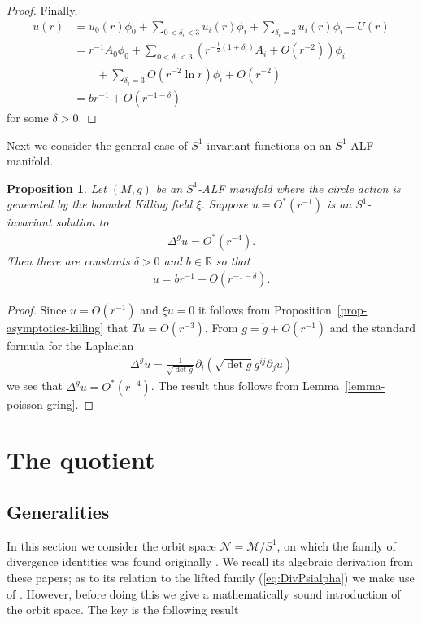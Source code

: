 \documentclass[a4paper,11pt,reqno]{amsart}
\newcommand{\Reals}{\mathbb{R}}
\newcommand{\cM}{\mathcal{M}}
\newcommand{\cN}{\mathcal{N}}
\theoremstyle{plain}
\newtheorem{prop}[thm]{Proposition}
\newcommand{\gring}{\mathring{g}}
\numberwithin{equation}{section}
\begin{document}
\begin{proof}
Finally,
\begin{align}
u(r) &= 
u_0(r)\phi_0 
+ \sum_{0 < \delta_i < 3} u_i(r) \phi_i 
+ \sum_{\delta_i = 3} u_i(r) \phi_i 
+ U(r) \\
&=
r^{-1} A_0 \phi_0
+ \sum_{0 < \delta_i < 3} 
\left( r^{-\frac{1}{2}(1+\delta_i)} A_i + O(r^{-2}) \right)\phi_i \\
&\qquad
+ \sum_{\delta_i = 3} O(r^{-2} \ln r)  \phi_i
+ O(r^{-2})\\
&= b r^{-1} + O(r^{-1-\delta})
\end{align}
for some $\delta > 0$.
\end{proof}

Next we consider the general case of $S^1$-invariant functions on an $S^1$-ALF manifold. 

\begin{prop} \label{prop:poisson-g}
Let $(M,g)$ be an $S^1$-ALF manifold where the circle action is generated by the bounded Killing field $\xi$. Suppose $u = O^*(r^{-1})$ is an $S^1$-invariant solution to
\begin{align}
\Delta^{g}u = O^*(r^{-4}).
\end{align}
Then there are constants $\delta >0$ and $b \in \Reals$ so that 
\begin{align} 
u = br^{-1} + O(r^{-1-\delta}).
\end{align} 
\end{prop}

\begin{proof}
Since $u = O(r^{-1})$ and $\xi u = 0$ it follows from Proposition~\ref{prop-asymptotics-killing} that $Tu = O(r^{-3})$. From $g = \gring + O(r^{-1})$ and the standard formula for the Laplacian
\begin{align}
\Delta^g u 
= \frac{1}{\sqrt{\det g}} \partial_i \left( \sqrt{\det g} g^{ij}  \partial_j u \right)
\end{align}
we see that $\Delta^{\gring}u = O^*(r^{-4})$. The result thus follows from Lemma~\ref{lemma-poisson-gring}.
\end{proof}





\section{The quotient}
\label{sec:quotient}
\subsection{Generalities}
In this section we consider the orbit space $\cN = \cM/ S^1$, on which the family  of divergence identities was found originally 
\cite{MR747036,simon:1995}. We recall its algebraic derivation  from these papers; as to its  relation to the lifted family (\ref{eq:DivPsialpha})  we make use of \cite{MR1701088}. 
However, before doing this we give a mathematically sound introduction of the orbit space.
The key is the following result
\end{document}
